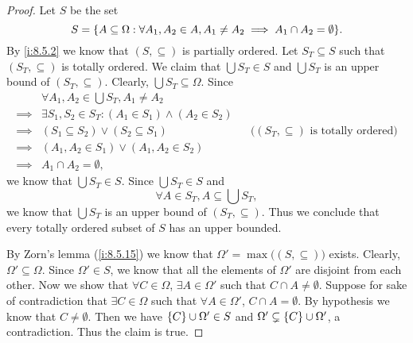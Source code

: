 \begin{proof}
  Let \(S\) be the set
  \[
    S = \set{A \subseteq \Omega : \forall A_1, A_2 \in A, A_1 \neq A_2 \implies A_1 \cap A_2 = \emptyset}.
  \]
  By \cref{i:8.5.2} we know that \((S, \subseteq)\) is partially ordered.
  Let \(S_T \subseteq S\) such that \((S_T, \subseteq)\) is totally ordered.
  We claim that \(\bigcup S_T \in S\) and \(\bigcup S_T\) is an upper bound of \((S_T, \subseteq)\).
  Clearly, \(\bigcup S_T \subseteq \Omega\).
  Since
  \begin{align*}
             & \forall A_1, A_2 \in \bigcup S_T, A_1 \neq A_2                                                                     \\
    \implies & \exists S_1, S_2 \in S_T : (A_1 \in S_1) \land (A_2 \in S_2)                                                       \\
    \implies & (S_1 \subseteq S_2) \lor (S_2 \subseteq S_1)                 &  & \text{(\((S_T, \subseteq)\) is totally ordered)} \\
    \implies & (A_1, A_2 \in S_1) \lor (A_1, A_2 \in S_2)                                                                         \\
    \implies & A_1 \cap A_2 = \emptyset,
  \end{align*}
  we know that \(\bigcup S_T \in S\).
  Since \(\bigcup S_T \in S\) and
  \[
    \forall A \in S_T, A \subseteq \bigcup S_T,
  \]
  we know that \(\bigcup S_T\) is an upper bound of \((S_T, \subseteq)\).
  Thus we conclude that every totally ordered subset of \(S\) has an upper bounded.

  By Zorn's lemma (\cref{i:8.5.15}) we know that \(\Omega' = \max\big((S, \subseteq)\big)\) exists.
  Clearly, \(\Omega' \subseteq \Omega\).
  Since \(\Omega' \in S\), we know that all the elements of \(\Omega'\) are disjoint from each other.
  Now we show that \(\forall C \in \Omega\), \(\exists A \in \Omega'\) such that \(C \cap A \neq \emptyset\).
  Suppose for sake of contradiction that \(\exists C \in \Omega\) such that \(\forall A \in \Omega'\), \(C \cap A = \emptyset\).
  By hypothesis we know that \(C \neq \emptyset\).
  Then we have \(\left\lbrace C\right\rbrace \cup \Omega' \in S\) and \(\Omega' \subsetneq \left\lbrace C\right\rbrace \cup \Omega'\), a contradiction.
  Thus the claim is true.


\end{proof}
